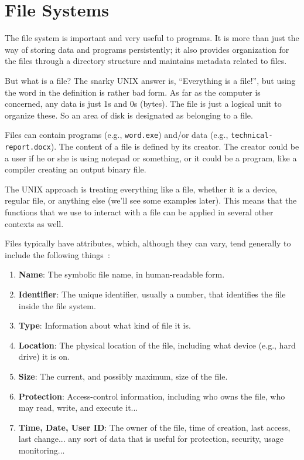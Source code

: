 




\section*{File Systems}

The file system is important and very useful to programs. It is more than just the way of storing data and programs persistently; it also provides organization for the files through a directory structure and maintains metadata related to files. 

But what is a file? The snarky UNIX answer is, ``Everything is a file!'', but using the word in the definition is rather bad form. As far as the computer is concerned, any data is just 1s and 0s (bytes). The file is just a logical unit to organize these. So an area of disk is designated as belonging to a file. 

Files can contain programs (e.g., \texttt{word.exe}) and/or data (e.g., \texttt{technical-report.docx}). The content of a file is defined by its creator. The creator could be a user if he or she is using notepad or something, or it could be a program, like a compiler creating an output binary file.

The UNIX approach is treating everything like a file, whether it is a device, regular file, or anything else (we'll see some examples later). This means that the functions that we use to interact with a file can be applied in several other contexts as well.

Files typically have attributes, which, although they can vary, tend generally to include the following things~\cite{osc}:

\begin{enumerate}
	\item \textbf{Name}: The symbolic file name, in human-readable form.
	\item \textbf{Identifier}: The unique identifier, usually a number, that identifies the file inside the file system.
	\item \textbf{Type}: Information about what kind of file it is.
	\item \textbf{Location}: The physical location of the file, including what device (e.g., hard drive) it is on.
	\item \textbf{Size}: The current, and possibly maximum, size of the file.
	\item \textbf{Protection}: Access-control information, including who owns the file, who may read, write, and execute it...
	\item \textbf{Time, Date, User ID}: The owner of the file, time of creation, last access, last change... any sort of data that is useful for protection, security, usage monitoring...
\end{enumerate}

